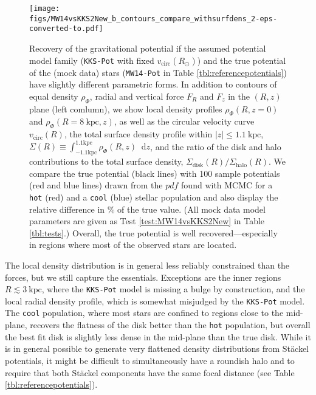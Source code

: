 \documentclass[iop,revtex4,numberedappendix,appendixfloats]{emulateapj}
\newcommand*\diff{\mathop{}\!\mathrm{d}}
\newcommand{\pdf}{\ensuremath{pdf}}
\begin{document}
\begin{figure*}[!htb]
\centering
\texttt{[image: figs/MW14vsKKS2New\_b\_contours\_compare\_withsurfdens\_2-eps-converted-to.pdf]}
\caption{Recovery of the gravitational potential if the assumed potential model family (\texttt{KKS-Pot} with fixed $v_\text{circ}(R_\odot)$) and the true potential of the (mock data) stars (\texttt{MW14-Pot} in Table \ref{tbl:referencepotentials}) have slightly different parametric forms. In addition to contours of equal density $\rho_\Phi$, radial and vertical force $F_R$ and $F_z$ in the $(R,z)$ plane (left comlumn), we show local density profiles $\rho_\Phi(R,z=0)$ and $\rho_\Phi(R=8~\text{kpc},z)$, as well as the circular velocity curve $v_\text{circ}(R)$, the total surface density profile within $|z|\leq1.1~\text{kpc}$, $\Sigma(R) \equiv \int_{-1.1\text{kpc}}^{1.1\text{kpc}}\rho_\Phi(R,z)\diff z$, and the ratio of the disk and halo contributions to the total surface density, $\Sigma_\text{disk}(R)/\Sigma_\text{halo}(R)$. We compare the true potential (black lines) with 100 sample potentials (red and blue lines) drawn from the \pdf{} found with MCMC for a \texttt{hot} (red) and a \texttt{cool} (blue) stellar population and also display the relative difference in \% of the true value. (All mock data model parameters are given as Test \ref{test:MW14vsKKS2New} in Table \ref{tbl:tests}.) Overall, the true potential is well recovered---especially in regions where most of the observed stars are located.}
\label{fig:MW14vsKKS2New_contours}
\end{figure*}

The local density distribution is in general less reliably constrained than the forces, but we still capture the essentials. Exceptions are the inner regions $R\lesssim3~\text{kpc}$, where the \texttt{KKS-Pot} model is missing a bulge by construction, and the local radial density profile, which is somewhat misjudged by the \texttt{KKS-Pot} model. The \texttt{cool} population, where most stars are confined to regions close to the mid-plane, recovers the flatness of the disk better than the \texttt{hot} population, but overall the best fit disk is slightly less dense in the mid-plane than the true disk. While it is in general possible to generate very flattened density distributions from St\"{a}ckel potentials, it might be difficult to simultaneously have a roundish halo and to require that both St\"{a}ckel components have the same focal distance (see Table \ref{tbl:referencepotentials}).
\end{document}
